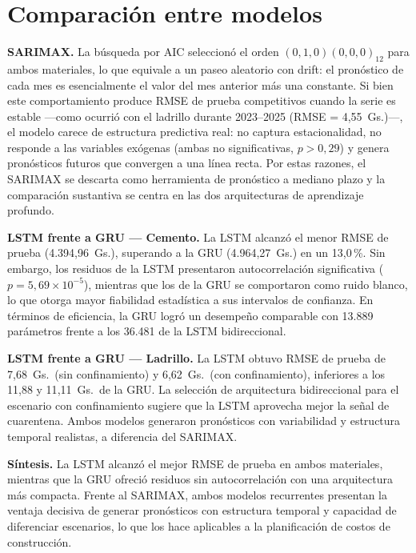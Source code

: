 \section{Comparación entre modelos}

\justify
\textbf{SARIMAX.} La búsqueda por AIC seleccionó el orden $(0,1,0)(0,0,0)_{12}$ para ambos materiales, lo que equivale a un paseo aleatorio con drift: el pronóstico de cada mes es esencialmente el valor del mes anterior más una constante. Si bien este comportamiento produce RMSE de prueba competitivos cuando la serie es estable ---como ocurrió con el ladrillo durante 2023--2025 (RMSE = 4{,}55~Gs.)---, el modelo carece de estructura predictiva real: no captura estacionalidad, no responde a las variables exógenas (ambas no significativas, $p > 0{,}29$) y genera pronósticos futuros que convergen a una línea recta. Por estas razones, el SARIMAX se descarta como herramienta de pronóstico a mediano plazo y la comparación sustantiva se centra en las dos arquitecturas de aprendizaje profundo.

\justify
\textbf{LSTM frente a GRU --- Cemento.} La LSTM alcanzó el menor RMSE de prueba (4.394{,}96~Gs.), superando a la GRU (4.964{,}27~Gs.) en un 13{,}0\,\%. Sin embargo, los residuos de la LSTM presentaron autocorrelación significativa ($p = 5{,}69 \times 10^{-5}$), mientras que los de la GRU se comportaron como ruido blanco, lo que otorga mayor fiabilidad estadística a sus intervalos de confianza. En términos de eficiencia, la GRU logró un desempeño comparable con 13.889 parámetros frente a los 36.481 de la LSTM bidireccional.

\justify
\textbf{LSTM frente a GRU --- Ladrillo.} La LSTM obtuvo RMSE de prueba de 7{,}68~Gs.\ (sin confinamiento) y 6{,}62~Gs.\ (con confinamiento), inferiores a los 11{,}88 y 11{,}11~Gs.\ de la GRU. La selección de arquitectura bidireccional para el escenario con confinamiento sugiere que la LSTM aprovecha mejor la señal de cuarentena. Ambos modelos generaron pronósticos con variabilidad y estructura temporal realistas, a diferencia del SARIMAX.

\justify
\textbf{Síntesis.} La LSTM alcanzó el mejor RMSE de prueba en ambos materiales, mientras que la GRU ofreció residuos sin autocorrelación con una arquitectura más compacta. Frente al SARIMAX, ambos modelos recurrentes presentan la ventaja decisiva de generar pronósticos con estructura temporal y capacidad de diferenciar escenarios, lo que los hace aplicables a la planificación de costos de construcción.

